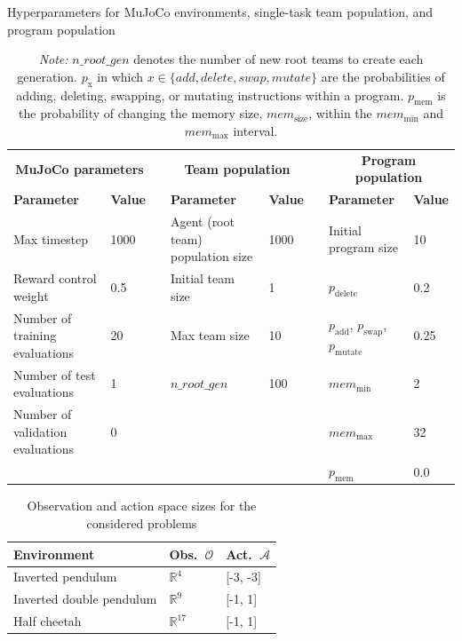 \documentclass[sigconf]{acmart}
\begin{document}
\begin{table}
  \caption{Hyperparameters for MuJoCo environments, single-task team population, and program population}
  \label{tab:hyperparameters}
  \centering
  \begin{tabular}{llcllcll}
    \toprule
    \multicolumn{2}{c}{\textbf{MuJoCo parameters}} & & \multicolumn{2}{c}{\textbf{Team population}} & & \multicolumn{2}{c}{\textbf{Program population}} \\
    \cmidrule(r){1-2} \cmidrule(lr){4-5} \cmidrule(l){7-8}
    \textbf{Parameter} & \textbf{Value} & & \textbf{Parameter} & \textbf{Value} & & \textbf{Parameter} & \textbf{Value} \\
    \midrule
    Max timestep & 1000 & & Agent (root team) population size & 1000 & & Initial program size & 10 \\
    Reward control weight & 0.5 & & Initial team size & 1 & & $p_\text{delete}$ & 0.2 \\
    Number of training evaluations & 20 & & Max team size & 10 & & $p_\text{add}$, $p_\text{swap}$, $p_\text{mutate}$ & 0.25 \\
    Number of test evaluations & 1 & & $n\_root\_gen$ & 100 & & $mem_\text{min}$ & 2 \\
    Number of validation evaluations & 0 & & & & & $mem_\text{max}$ & 32 \\
    & & & & & & $p_\text{mem}$ & 0.0 \\
    \bottomrule
  \end{tabular}
  \caption*{\small \textit{Note:} $n\_root\_gen$ denotes the number of new root teams to create each generation. $p_\text{x}$ in which $x \in \{add, delete, swap, mutate\}$ are the probabilities of adding, deleting, swapping, or mutating instructions within a program. $p_\text{mem}$ is the probability of changing the memory size, $mem_\text{size}$, within the $mem_\text{min}$ and $mem_\text{max}$ interval.}
\end{table}

\begin{table}
  \caption{Observation and action space sizes for the considered problems \cite{gymnasium_mujoco}}
  \label{tab:observation_space}
  \begin{tabular}{lll}
    \toprule
    \textbf{Environment}&\textbf{Obs.}~$\mathcal{O}$&\textbf{Act.}~$\mathcal{A}$\\
    \midrule
    Inverted pendulum & $\mathbb{R}^4$ & [-3, -3]\\
    Inverted double pendulum & $\mathbb{R}^9$ & [-1, 1]\\
    Half cheetah & $\mathbb{R}^{17}$ & [-1, 1]\\
  \bottomrule
\end{tabular}
\end{table}
\end{document}

